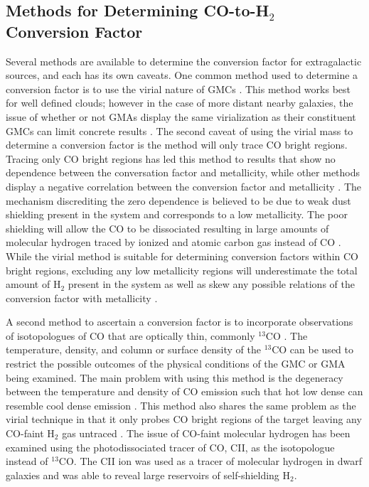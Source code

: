 \subsection{Methods for Determining CO-to-H$_2$ Conversion Factor}\label{gettinx}

Several methods are available to determine the conversion factor for extragalactic sources, and each has its own caveats.  One common method used to determine a conversion factor is to use the virial nature of GMCs \citep{bolatto2013}.  This method works best for well defined clouds; however in the case of more distant nearby galaxies, the issue of whether or not GMAs display the same virialization as their constituent GMCs can limit concrete results \citep{bolatto2013}.  The second caveat of using the virial mass to determine a conversion factor is the method will only trace CO bright regions.   Tracing only CO bright regions has led this method to results that show no dependence between the conversation factor and metallicity, while other methods display a negative correlation between the conversion factor and metallicity  \citep{bolatto2013}.   The mechanism discrediting the zero dependence is believed to be due to weak dust shielding present in the system and corresponds to a low metallicity.  The poor shielding will allow the CO to be dissociated resulting in large amounts of molecular hydrogen traced by ionized and atomic carbon gas instead of CO \citep{bolatto2013}.  While the virial method is suitable for determining conversion factors within CO bright regions, excluding any low metallicity regions will underestimate the total amount of H$_2$ present in the system as well as skew any possible relations of the conversion factor with metallicity \citep{bolatto2013}.

A second method to ascertain a conversion factor is to incorporate observations of isotopologues of CO that are optically thin, commonly $^{13}$CO \citep{bolatto2013}.   The temperature, density, and column or surface density of the $^{13}$CO can be used to restrict the possible outcomes of the physical conditions of the GMC or GMA being examined.  The main problem with using this method is the degeneracy between the temperature and density of CO emission such that hot low dense can resemble cool dense emission \citep{rosenberg2014}. This method also shares the same problem as the virial technique in that it only probes CO bright regions of the target leaving any CO-faint H$_2$ gas untraced \citep{bolatto2013}.  The issue of CO-faint molecular hydrogen has been examined using the photodissociated tracer of CO, CII, as the isotopologue instead of $^{13}$CO.  The CII ion was used as a tracer of molecular hydrogen in dwarf galaxies and was able to reveal large reservoirs of self-shielding H$_2$\citep{madden1997}.

